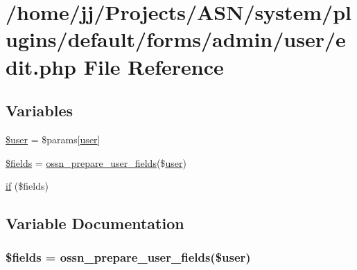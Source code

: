 \hypertarget{system_2plugins_2default_2forms_2admin_2user_2edit_8php}{}\section{/home/jj/\+Projects/\+A\+S\+N/system/plugins/default/forms/admin/user/edit.php File Reference}
\label{system_2plugins_2default_2forms_2admin_2user_2edit_8php}
\subsection*{Variables}
\begin{DoxyCompactItemize}
\item 
\hyperlink{system_2plugins_2default_2forms_2admin_2user_2edit_8php_a598ca4e71b15a1313ec95f0df1027ca5}{\$user} = \$params\mbox{[}\textquotesingle{}\hyperlink{ossn_8config_8db_8example_8php_a802544b7ba9f79bbf24ef67773d53bed}{user}\textquotesingle{}\mbox{]}
\item 
\hyperlink{system_2plugins_2default_2forms_2admin_2user_2edit_8php_ab2303c817e3b402b77b7f99627b9c319}{\$fields} = \hyperlink{ossn_8lib_8users_8php_aa6c0fa7ee8f8d7d00ce56782fad5ea38}{ossn\+\_\+prepare\+\_\+user\+\_\+fields}(\$\hyperlink{ossn_8config_8db_8example_8php_a802544b7ba9f79bbf24ef67773d53bed}{user})
\item 
\hyperlink{system_2plugins_2default_2forms_2admin_2user_2edit_8php_a8f8f961f5c31273010ec545b33c635b2}{if} (\$fields)
\end{DoxyCompactItemize}


\subsection{Variable Documentation}
\subsubsection[{\texorpdfstring{\$fields}{$fields}}]{\setlength{\rightskip}{0pt plus 5cm}\$fields = {\bf ossn\+\_\+prepare\+\_\+user\+\_\+fields}(\${\bf user})}\hypertarget{system_2plugins_2default_2forms_2admin_2user_2edit_8php_ab2303c817e3b402b77b7f99627b9c319}{}\label{system_2plugins_2default_2forms_2admin_2user_2edit_8php_ab2303c817e3b402b77b7f99627b9c319}


